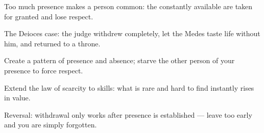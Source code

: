 

\begin{distilled}
  \item Too much presence makes a person common: the constantly available are taken for granted and lose respect.
  \item The Deioces case: the judge withdrew completely, let the Medes taste life without him, and returned to a throne.
  \item Create a pattern of presence and absence; starve the other person of your presence to force respect.
  \item Extend the law of scarcity to skills: what is rare and hard to find instantly rises in value.
  \item Reversal: withdrawal only works after presence is established --- leave too early and you are simply forgotten.
\end{distilled}
